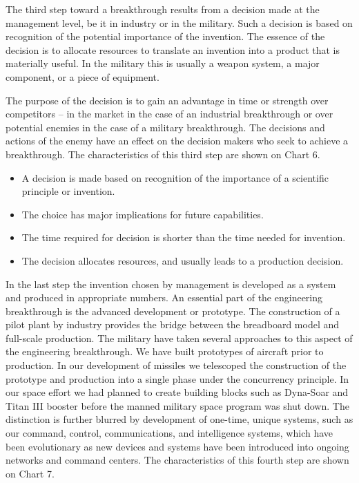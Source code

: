 The third step toward a breakthrough results from a decision made at the management level, be it in industry or in the military. Such a decision is based on recognition of the potential importance of the invention. The essence of the decision is to allocate resources to translate an invention into a product that is materially useful. In the military this is usually a weapon system, a major component, or a piece of equipment.

The purpose of the decision is to gain an advantage in time or strength over competitors -- in the market in the case of an industrial breakthrough or over potential enemies in the case of a military breakthrough. The decisions and actions of the enemy have an effect on the decision makers who seek to achieve a breakthrough. The characteristics of this third step are shown on Chart 6.

\begin{mdframed}[nobreak=true, backgroundcolor=ApricotWhite, frametitle={CHART 6: The Management Breakthrough}] 
    \begin{itemize}
        \item A decision is made based on recognition of the importance of a scientific principle or invention.
        \item The choice has major implications for future capabilities.
        \item The time required for decision is shorter than the time needed for invention.
        \item The decision allocates resources, and usually leads to a production decision.
    \end{itemize}
\end{mdframed}

In the last step the invention chosen by management is developed as a system and produced in appropriate numbers. An essential part of the engineering breakthrough is the advanced development or prototype. The construction of a pilot plant by industry provides the bridge between the breadboard model and full-scale production.
The military have taken several approaches to this aspect of the engineering breakthrough. We have built prototypes of aircraft prior to production. In our development of missiles we telescoped the construction of the prototype and production into a single phase under the concurrency principle. In our space effort we had planned to create building blocks such as Dyna-Soar and Titan III booster before the manned military space program was shut down. 
The distinction is further blurred by development of one-time, unique systems, such as our command, control, communications, and intelligence systems, which have been evolutionary as new devices and systems have been introduced into ongoing networks and command centers. The characteristics of this fourth step are shown on Chart 7.


